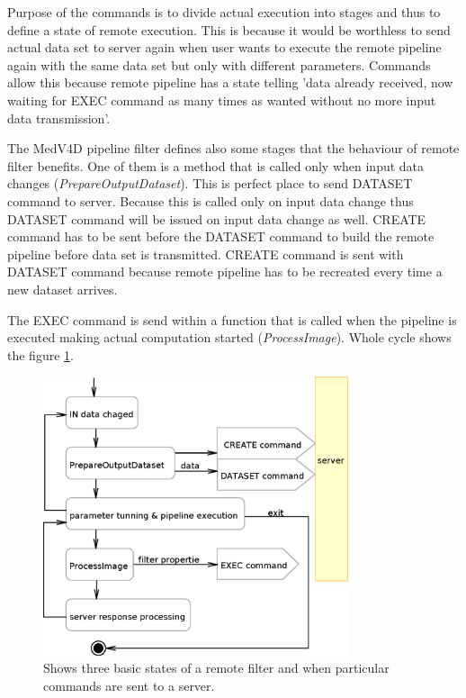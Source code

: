 \par
Purpose of the commands is to divide actual execution into stages and thus to define a state of remote execution.
This is because it would be worthless to send actual data set to server again when user wants to execute the remote pipeline again with the same data set but only with different parameters.
Commands allow this because remote pipeline has a state telling 'data already received, now waiting for EXEC command as many times as wanted without no more input data transmission'.

\par
The MedV4D pipeline filter defines also some stages that the behaviour of remote filter benefits.
One of them is a method that is called only when input data changes (\mbox{\emph{PrepareOutputDataset}}).
This is perfect place to send DATASET command to server.
Because this is called only on input data change thus DATASET command will be issued on input data change as well.
CREATE command has to be sent before the DATASET command to build the remote pipeline before data set is transmitted.
CREATE command is sent with DATASET command because remote pipeline has to be recreated every time a new dataset arrives.

\par
The EXEC command is send within a function that is called when the pipeline is executed making actual computation started (\mbox{\emph{ProcessImage}}).
Whole cycle shows the figure \ref{fg:RCClientCycle}.

\begin{figure}
    \centering
    \includegraphics[width=0.8\textwidth]{data/RCClientCycle}
    \caption[Remote MedV4D filter]{Shows three basic states of a remote filter and when particular commands are sent to a server.}
    \label{fg:RCClientCycle}
\end{figure}

